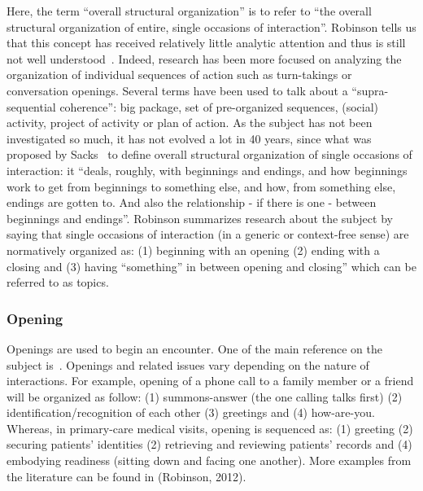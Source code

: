 \documentclass[a4paper,11pt,twoside]{StyleThese}
\begin{document}
Here, the term ``overall structural organization'' is to refer to ``the overall structural organization of entire, single occasions of interaction''. Robinson tells us that this concept has received relatively little analytic attention and thus is still not well understood~\cite{robinson_overall_2012}. Indeed, research has been more focused on analyzing the organization of individual sequences of action such as turn-takings or conversation openings. Several terms have been used to talk about a ``supra-sequential coherence'': big package, set of pre-organized sequences, (social) activity, project of activity or plan of action. As the subject has not been investigated so much, it has not evolved a lot in 40 years, since what was proposed by Sacks~\cite{sacks_lectures_1995} to define overall structural organization of single occasions of interaction: it ``deals, roughly, with beginnings and endings, and how beginnings work to get from beginnings to something else, and how, from something else, endings are gotten to. And also the relationship - if there is one - between beginnings and endings''. Robinson summarizes research about the subject by saying that single occasions of interaction (in a generic or context-free sense) are normatively organized as: (1) beginning with an opening (2) ending with a closing and (3) having ``something'' in between opening and closing'' which can be referred to as topics.

\subsubsection{Opening}
Openings are used to begin an encounter. One of the main reference on the subject is~\cite{schegloff_1986_routine}. Openings and related issues vary depending on the nature of interactions. For example, opening of a phone call to a family member or a friend will be organized as follow: (1) summons-answer (the one calling talks first) (2) identification/recognition of each other (3) greetings and (4) how-are-you. Whereas, in primary-care medical visits, opening is sequenced as: (1) greeting (2) securing patients’ identities (2) retrieving and reviewing patients’ records and (4) embodying readiness (sitting down and facing one another). More examples from the literature can be found in (Robinson, 2012). 
\end{document}
